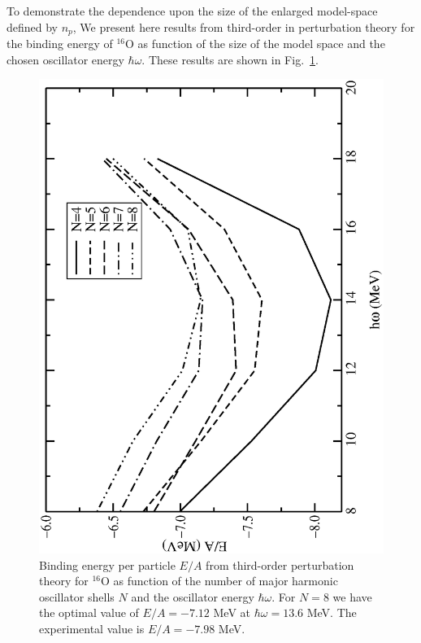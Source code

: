 \documentclass{article}
\begin{document}
To demonstrate the dependence upon the size of the enlarged model-space
defined by $n_p$, 
We present here results from third-order in perturbation theory for the 
binding energy of $^{16}$O as function of the size of the model
space and the chosen oscillator energy $\hbar\omega$.
These results are shown in Fig.~\ref{fig:mbptox}. 
\begin{figure}
\begin{center}
\includegraphics[angle=270, scale=0.5]{mbptox.eps}
\caption{Binding energy per particle $E/A$ 
from third-order perturbation theory for $^{16}$O as function 
of the number of major harmonic oscillator shells $N$ 
and the oscillator energy $\hbar\omega$. For $N=8$ we have the optimal value of
$E/A=-7.12$ MeV at $\hbar\omega = 13.6$ MeV. The experimental value is
$E/A=-7.98$ MeV.}
\label{fig:mbptox}
\end{center}
\end{figure}
\end{document}

